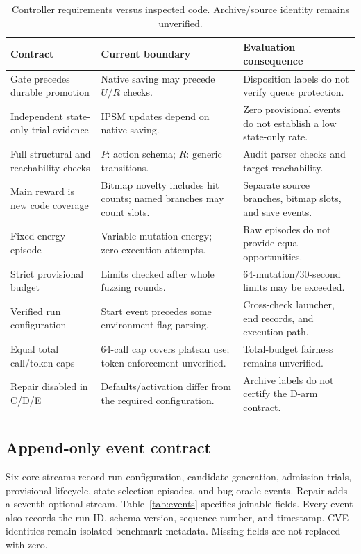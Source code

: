 \documentclass[final,5p,times,number]{elsarticle}
\begin{document}
\begin{table}[!tbp]
\centering\small
\caption{Controller requirements versus inspected code. Archive/source identity remains unverified.}
\label{tab:implementation}
\begin{tabularx}{\textwidth}{Y Y Y}
\toprule
Contract & Current boundary & Evaluation consequence \\
\midrule
Gate precedes durable promotion & Native saving may precede $U/R$ checks. & Disposition labels do not verify queue protection. \\
Independent state-only trial evidence & IPSM updates depend on native saving. & Zero provisional events do not establish a low state-only rate. \\
Full structural and reachability checks & $P$: action schema; $R$: generic transitions. & Audit parser checks and target reachability. \\
Main reward is new code coverage & Bitmap novelty includes hit counts; named branches may count slots. & Separate source branches, bitmap slots, and save events. \\
Fixed-energy episode & Variable mutation energy; zero-execution attempts. & Raw episodes do not provide equal opportunities. \\
Strict provisional budget & Limits checked after whole fuzzing rounds. & 64-mutation/30-second limits may be exceeded. \\
Verified run configuration & Start event precedes some environment-flag parsing. & Cross-check launcher, end records, and execution path. \\
Equal total call/token caps & 64-call cap covers plateau use; token enforcement unverified. & Total-budget fairness remains unverified. \\
Repair disabled in C/D/E & Defaults/activation differ from the required configuration. & Archive labels do not certify the D-arm contract. \\
\bottomrule
\end{tabularx}
\end{table}

\subsection{Append-only event contract}
Six core streams record run configuration, candidate generation, admission trials, provisional lifecycle, state-selection episodes, and bug-oracle events. Repair adds a seventh optional stream. Table~\ref{tab:events} specifies joinable fields. Every event also records the run ID, schema version, sequence number, and timestamp. CVE identities remain isolated benchmark metadata. Missing fields are not replaced with zero.
\end{document}
